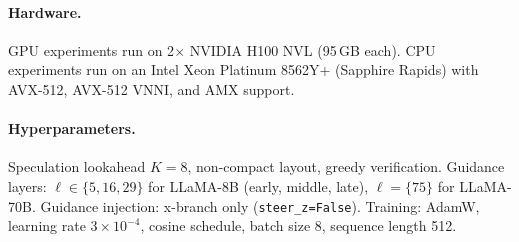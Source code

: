 \paragraph{Hardware.}
GPU experiments run on 2$\times$ NVIDIA H100 NVL (95\,GB each).
CPU experiments run on an Intel Xeon Platinum 8562Y+ (Sapphire Rapids) with AVX-512, AVX-512 VNNI, and AMX support.

\paragraph{Hyperparameters.}
Speculation lookahead $K\!=\!8$, non-compact layout, greedy verification.
Guidance layers: $\ell \in \{5, 16, 29\}$ for LLaMA-8B (early, middle, late), $\ell = \{75\}$ for LLaMA-70B.
Guidance injection: x-branch only (\texttt{steer\_z=False}).
Training: AdamW, learning rate $3{\times}10^{-4}$, cosine schedule, batch size 8, sequence length 512.
